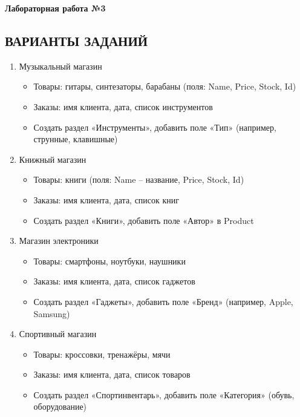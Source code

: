 \documentclass[12pt]{article}
\newcommand{\lablogo}
{
\begin{center}
    \huge{\textbf{Лабораторная работа №3}} \\
\end{center}
}
\renewcommand{\texttt}[1]{{\small\ttfamily #1}}
\numberwithin{listing}{section}
\numberwithin{figure}{section}
\begin{document}
\newpage

\lablogo

\begin{center}
	\subsection{ВАРИАНТЫ ЗАДАНИЙ \ \texorpdfstring{\faTasks}{}}
\end{center}

\begin{enumerate}
	\item Музыкальный магазин
	      \begin{itemize}
		      \item Товары: гитары, синтезаторы, барабаны (поля: \texttt{Name}, \texttt{Price}, \texttt{Stock}, \texttt{Id})
		      \item Заказы: имя клиента, дата, список инструментов
		      \item Создать раздел «Инструменты», добавить поле «Тип» (например, струнные, клавишные)
	      \end{itemize}

	\item Книжный магазин
	      \begin{itemize}
		      \item Товары: книги (поля: \texttt{Name} -- название, \texttt{Price}, \texttt{Stock}, \texttt{Id})
		      \item Заказы: имя клиента, дата, список книг
		      \item Создать раздел «Книги», добавить поле «Автор» в \texttt{Product}
	      \end{itemize}

	\item Магазин электроники
	      \begin{itemize}
		      \item Товары: смартфоны, ноутбуки, наушники
		      \item Заказы: имя клиента, дата, список гаджетов
		      \item Создать раздел «Гаджеты», добавить поле «Бренд» (например, Apple, Samsung)
	      \end{itemize}


	\item Спортивный магазин
	      \begin{itemize}
		      \item Товары: кроссовки, тренажёры, мячи
		      \item Заказы: имя клиента, дата, список товаров
		      \item Создать раздел «Спортинвентарь», добавить поле «Категория» (обувь, оборудование)
	      \end{itemize}


\end{enumerate}
\end{document}
